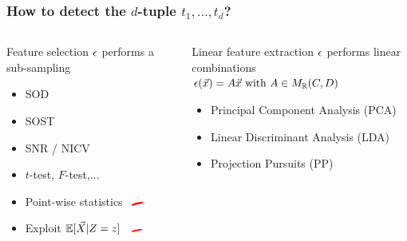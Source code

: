 \begin{frame}
\vspace*{-10pt}
\frametitle{How to detect the $d$-tuple $t_1,\dots, t_d$?}
\begin{columns}

\begin{column}{.4\textwidth}
\begin{scriptsize}
\begin{block}{Feature selection}
$\epsilon$ performs a sub-sampling
\begin{itemize}
\item SOD \cite{Chari2003}
\item SOST \cite{bar2010improved}
\item SNR \cite{mangard2008power}/ NICV \cite{bhasin2014side}
\item $t$-test, $F$-test,... \cite{gierlichs2006templates,choudary2014efficient}
\end{itemize}
\end{block}
\end{scriptsize}

\begin{itemize}
\item Point-wise statistics \ \includegraphics[width=10pt]{figures/no.png}
\item Exploit $\mathbb{E}[\vec{X}\lvert Z=z]$ \ \includegraphics[width=10pt]{figures/no.png}
\end{itemize}
\end{column}


\begin{column}{.6\textwidth}
\begin{scriptsize}

\begin{block}{Linear feature extraction}
$\epsilon$ performs linear combinations\\
$\epsilon(\vec{x}) = A\vec{x} \mbox{ with } A \in M_{\mathbb{R}}(C, D)$
\begin{itemize}
\item Principal Component Analysis (PCA) \cite{TAprincipal,Batina2012}
\item Linear Discriminant Analysis (LDA) \cite{Standaert2008,lessIsMore}
\item Projection Pursuits (PP) \cite{PP}
\end{itemize}
\end{block}
\end{scriptsize}


\end{column}
\end{columns}
\end{frame}
